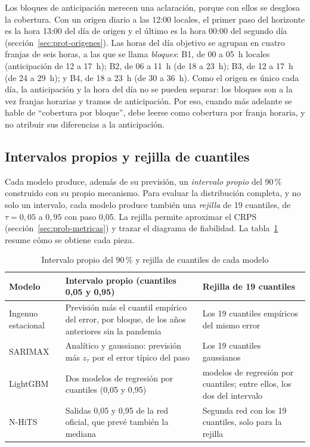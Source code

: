Los bloques de anticipación merecen una aclaración, porque con ellos se
desglosa la cobertura. Con un origen diario a las 12:00 locales, el primer
paso del horizonte es la hora 13:00 del día de origen y el último es la hora
00:00 del segundo día (sección~\ref{sec:prot-origenes}). Las horas del día
objetivo se agrupan en cuatro franjas de seis horas, a las que se llama
\emph{bloques}: B1, de 00 a 05~h locales (anticipación de 12 a 17~h); B2, de
06 a 11~h (de 18 a 23~h); B3, de 12 a 17~h (de 24 a 29~h); y B4, de 18 a
23~h (de 30 a 36~h). Como el origen es único cada día, la anticipación y la
hora del día no se pueden separar: los bloques son a la vez franjas
horarias y tramos de anticipación. Por eso, cuando más adelante se hable de
\enquote{cobertura por bloque}, debe leerse como cobertura por franja
horaria, y no atribuir sus diferencias a la anticipación.

\subsection{Intervalos propios y rejilla de cuantiles}\label{sec:prob-propios}

Cada modelo produce, además de su previsión, un \emph{intervalo propio} del
90\,\% construido con su propio mecanismo. Para evaluar la distribución
completa, y no solo un intervalo, cada modelo produce también una
\emph{rejilla} de 19 cuantiles, de $\tau = 0{,}05$ a $0{,}95$ con paso
0,05. La rejilla permite aproximar el CRPS (sección~\ref{sec:prob-metricas})
y trazar el diagrama de fiabilidad. La tabla~\ref{tab:intervalos-propios}
resume cómo se obtiene cada pieza.

\begin{table}[htbp]
	\centering
	\caption{Intervalo propio del 90\,\% y rejilla de cuantiles de cada modelo}
	\label{tab:intervalos-propios}
	\small
	\begin{tabularx}{\textwidth}{>{\raggedright\arraybackslash}p{2.2cm} >{\raggedright\arraybackslash}X >{\raggedright\arraybackslash}X}
		\hline
		\textbf{Modelo} & \textbf{Intervalo propio (cuantiles 0,05 y 0,95)} & \textbf{Rejilla de 19 cuantiles} \\
		\hline
		Ingenuo estacional & Previsión más el cuantil empírico del error, por bloque, de los años anteriores sin la pandemia & Los 19 cuantiles empíricos del mismo error \\
		SARIMAX & Analítico y gaussiano: previsión más $z_\tau$ por el error típico del paso & Los 19 cuantiles gaussianos \\
		LightGBM & Dos modelos de regresión por cuantiles (0,05 y 0,95) & 19 modelos de regresión por cuantiles; entre ellos, los dos del intervalo \\
		N-HiTS & Salidas 0,05 y 0,95 de la red oficial, que prevé también la mediana & Segunda red con los 19 cuantiles, solo para la rejilla \\
		\hline
	\end{tabularx}
\end{table}

